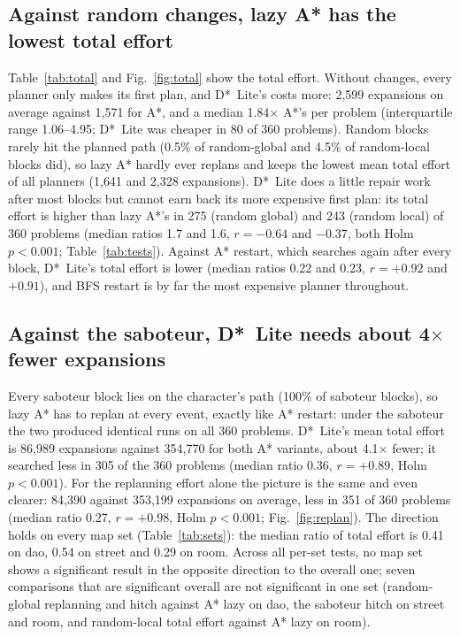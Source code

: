 \documentclass[conference,12pt]{IEEEtran}
\newcommand{\dstar}{D*~Lite}
\begin{document}
\subsection{Against random changes, lazy A* has the lowest total effort}
Table~\ref{tab:total} and Fig.~\ref{fig:total} show the total effort. Without changes, every
planner only makes its first plan, and \dstar{}'s costs more: 2{,}599 expansions on average
against 1{,}571 for A*, and a median 1.84$\times$ A*'s per problem (interquartile range
1.06--4.95; \dstar{} was cheaper in 80 of 360 problems). Random blocks rarely hit the planned
path (0.5\% of random-global and 4.5\% of random-local blocks did), so lazy A* hardly ever
replans and keeps the lowest mean total effort of all planners (1{,}641 and 2{,}328
expansions). \dstar{} does a little repair work after most blocks but cannot earn back its more
expensive first plan: its total effort is higher than lazy A*'s in 275 (random global) and 243
(random local) of 360 problems (median ratios 1.7 and 1.6, $r=-0.64$ and $-0.37$, both Holm
$p<0.001$; Table~\ref{tab:tests}). Against A* restart, which searches again after every block,
\dstar{}'s total effort is lower (median ratios 0.22 and 0.23, $r=+0.92$ and $+0.91$), and BFS
restart is by far the most expensive planner throughout.

\subsection{Against the saboteur, \dstar{} needs about 4$\times$ fewer expansions}
Every saboteur block lies on the character's path (100\% of saboteur blocks), so lazy A* has
to replan at every event, exactly like A* restart: under the saboteur the two produced identical
runs on all 360 problems. \dstar{}'s mean total effort is 86{,}989 expansions against 354{,}770
for both A* variants, about 4.1$\times$ fewer; it searched less in 305 of the 360 problems
(median ratio 0.36, $r=+0.89$, Holm $p<0.001$). For the replanning effort alone the picture is
the same and even clearer: 84{,}390 against 353{,}199 expansions on average, less in 351 of 360
problems (median ratio 0.27, $r=+0.98$, Holm $p<0.001$; Fig.~\ref{fig:replan}). The direction
holds on every map set (Table~\ref{tab:sets}): the median ratio of total effort is 0.41 on dao,
0.54 on street and 0.29 on room. Across all per-set tests, no map set shows a significant result
in the opposite direction to the overall one; seven comparisons that are significant overall are
not significant in one set (random-global replanning and hitch against A* lazy on dao, the
saboteur hitch on street and room, and random-local total effort against A* lazy on room).
\end{document}
